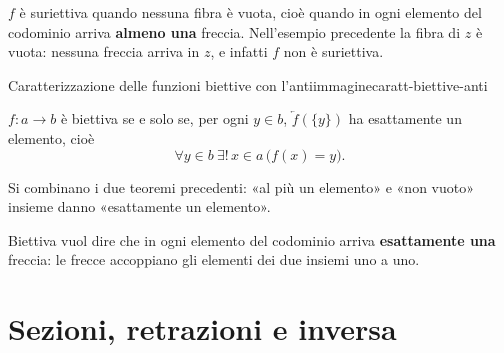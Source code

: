 \begin{spiegazione}
    $f$ è suriettiva quando nessuna fibra è vuota, cioè quando in ogni elemento del codominio arriva \textbf{almeno una} freccia. Nell'esempio precedente
    la fibra di $z$ è vuota: nessuna freccia arriva in $z$, e infatti $f$ non è suriettiva.
\end{spiegazione}


\begin{concetto}
\begin{Corollario}{Caratterizzazione delle funzioni biettive con l'antiimmagine}{caratt-biettive-anti}
    \begin{prerequisiti}
    \end{prerequisiti}
    $f \colon a \to b$ è biettiva se e solo se, per ogni $y \in b$, $\overleftarrow{f}(\{y\})$ ha esattamente un elemento, cioè
    \[ \forall y \in b\ \exists!\, x \in a\,\big(f(x) = y\big). \]
\end{Corollario}
\begin{dimostrazione}
    Si combinano i due teoremi precedenti: «al più un elemento» e «non vuoto» insieme danno «esattamente un elemento».
\end{dimostrazione}
\end{concetto}

\begin{spiegazione}
    Biettiva vuol dire che in ogni elemento del codominio arriva \textbf{esattamente una} freccia: le frecce accoppiano gli elementi dei due insiemi uno a uno.
    \begin{center}
    \end{center}
\end{spiegazione}


\section{Sezioni, retrazioni e inversa}\label{sec:sezioni}

